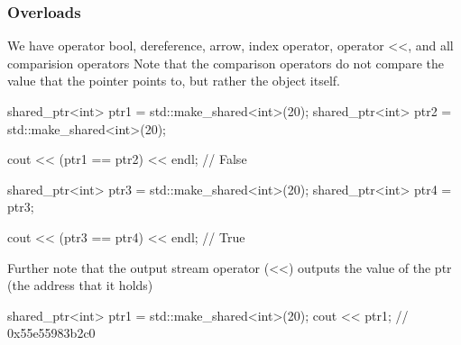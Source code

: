 \documentclass{report}
\begin{document}
        \subsubsection{Overloads}
        \bigbreak \noindent 
        We have operator bool, dereference, arrow, index operator, operator <<, and all comparision operators 
        \bigbreak \noindent 
        Note that the comparison operators do not compare the value that the pointer points to, but rather the object itself.
        \bigbreak \noindent 
        \begin{cppcode}
            shared_ptr<int> ptr1 = std::make_shared<int>(20);
            shared_ptr<int> ptr2 = std::make_shared<int>(20);

            cout << (ptr1 == ptr2) << endl; // False

            shared_ptr<int> ptr3 = std::make_shared<int>(20);
            shared_ptr<int> ptr4 = ptr3;

            cout << (ptr3 == ptr4) << endl; // True
        \end{cppcode}
        \bigbreak \noindent 
        Further note that the output stream operator (<<) outputs the value of the ptr (the address that it holds)
        \bigbreak \noindent 
        \begin{cppcode}
            shared_ptr<int> ptr1 = std::make_shared<int>(20);
            cout << ptr1; // 0x55e55983b2c0
        \end{cppcode}

        \bigbreak \noindent 
\end{document}

